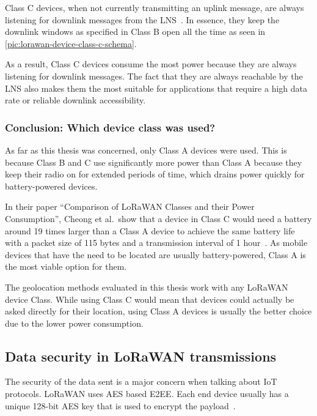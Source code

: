 Class C devices, when not currently transmitting an uplink message, are always listening for downlink messages from the \ac{LNS}~\cite[p. 86]{lora_alliance_inc_lorawan_specification_2017}.
In essence, they keep the downlink windows as specified in Class B open all the time as seen in \cref{pic:lorawan-device-class-c-schema}.

As a result, Class C devices consume the most power because they are always listening for downlink messages.
The fact that they are always reachable by the \ac{LNS} also makes them the most suitable for applications that require a high data rate or reliable downlink accessibility.

\subsubsection{Conclusion: Which device class was used?}

As far as this thesis was concerned, only Class A devices were used.
This is because Class B and C use significantly more power than Class A because they keep their radio on for extended periods of time, which drains power quickly for battery-powered devices.

In their paper ``Comparison of LoRaWAN Classes and their Power Consumption'', Cheong et al.\ show that a device in Class C would need a battery around 19 times larger than a Class A device to achieve the same battery life with a packet size of 115 bytes and a transmission interval of 1 hour~\cite{cheong_comparison_2017}.
As mobile devices that have the need to be located are usually battery-powered, Class A is the most viable option for them.

The geolocation methods evaluated in this thesis work with any \ac{LoRaWAN} device Class.
While using Class C would mean that devices could actually be asked directly for their location, using Class A devices is usually the better choice due to the lower power consumption.

\subsection{Data security in \ac{LoRaWAN} transmissions}

The security of the data sent is a major concern when talking about \ac{IoT} protocols.
\ac{LoRaWAN} uses \ac{AES} based \acf{E2EE}.
Each end device usually has a unique 128-bit \ac{AES} key that is used to encrypt the payload~\cite[p. 24]{lora_alliance_inc_lorawan_specification_2017}.

